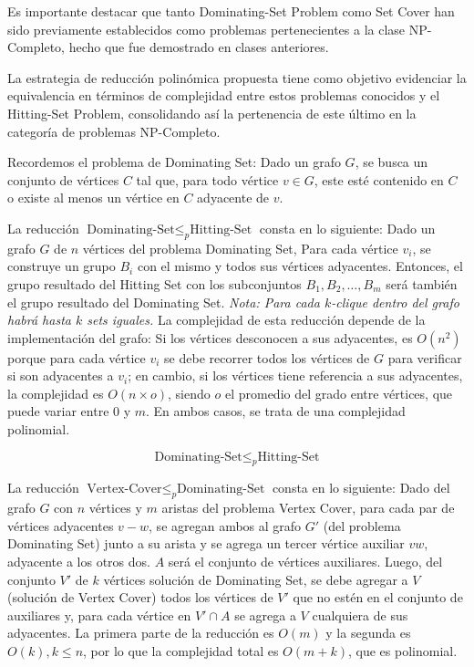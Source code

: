 Es importante destacar que tanto Dominating-Set Problem como Set Cover han sido previamente establecidos
como problemas pertenecientes a la clase NP-Completo, hecho que fue demostrado en clases anteriores.



La estrategia de reducción polinómica propuesta tiene como objetivo evidenciar la equivalencia en 
términos de complejidad entre estos problemas conocidos y el Hitting-Set Problem, consolidando así 
la pertenencia de este último en la categoría de problemas NP-Completo.






Recordemos el problema de Dominating Set: Dado un grafo $G$, se busca un conjunto de vértices $C$
tal que, para todo vértice $v \in G$, este esté contenido en $C$ o existe al menos un vértice en $C$ adyacente de $v$.

La reducción $\text{Dominating-Set} \leq_{p} \text{Hitting-Set}$ consta en lo siguiente:
Dado un grafo $G$ de $n$ vértices del problema Dominating Set, Para cada vértice $v_{i}$, se construye un grupo $B_{i}$ con el mismo y todos sus vértices adyacentes. Entonces, el grupo resultado del Hitting Set con los subconjuntos $B_{1},B_{2},\dots,B_{m}$ será también el grupo resultado del Dominating Set. \textit{Nota: Para cada $k$-clique dentro del grafo habrá hasta $k$ sets iguales.} La complejidad de esta reducción depende de la implementación del grafo: Si los vértices desconocen a sus adyacentes, es $O(n^{2})$ porque para cada vértice $v_{i}$ se debe recorrer todos los vértices de $G$ para verificar si son adyacentes a $v_{i}$; en cambio, si los vértices tiene referencia a sus adyacentes, la complejidad es $O(n\times o)$, siendo $o$ el promedio del grado entre vértices, que puede variar entre $0$ y $m$. En ambos casos, se trata de una complejidad polinomial.

\[\text{Dominating-Set}  \leq _{p} \text{Hitting-Set}\]


La reducción $\text{Vertex-Cover} \leq _{p} \text{Dominating-Set}$ consta en lo siguiente:
Dado del grafo $G$ con $n$ vértices y $m$ aristas del problema Vertex Cover, para cada par de vértices adyacentes $v-w$, se agregan ambos al grafo $G'$ (del problema Dominating Set) junto a su arista y se agrega un tercer vértice auxiliar $vw$, adyacente a los otros dos. $A$ será el conjunto de vértices auxiliares. Luego, del conjunto $V'$ de $k$ vértices solución de Dominating Set, se debe agregar a $V$ (solución de Vertex Cover) todos los vértices de $V'$ que no estén en el conjunto de auxiliares y, para cada vértice en $V' \cap A$ se agrega a $V$ cualquiera de sus adyacentes. La primera parte de la reducción es $O(m)$ y la segunda es $O(k),k \leq n$, por lo que la complejidad total es $O(m+k)$, que es polinomial.

